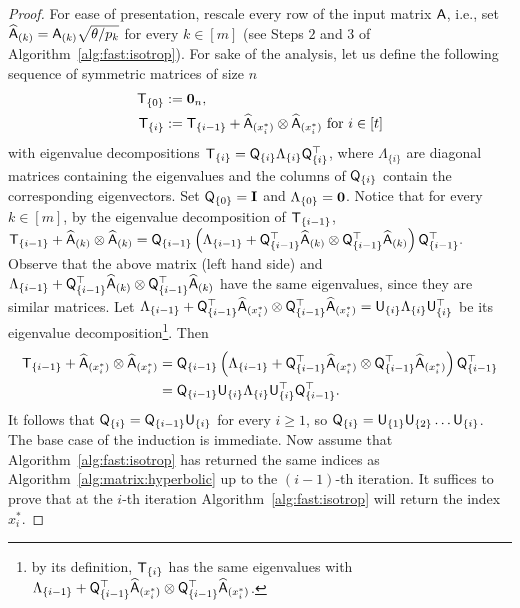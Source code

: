 \begin{proof}
%
For ease of presentation, rescale every row of the input matrix ${\mathsf{A} }$, i.e., set $ \widehat{{\mathsf{A} }}_{(k)} = {\mathsf{A} }_{(k)} \sqrt{ \theta / p_{k}}$ for every $k\in{[m]}$ (see Steps $2$ and $3$ of Algorithm~\ref{alg:fast:isotrop}). For sake of the analysis, let us define the following sequence of symmetric matrices of size $n$
\begin{align*}
{\ensuremath{\mathsf{T} }}_{\{0\}} &:= \mathbf{0}_n,\\
{\mathsf{T} }_{\{i\}} &:=  {\mathsf{T} }_{\{i - 1\}} + \widehat{{\mathsf{A} }}_{(x_i^*)} \otimes \widehat{{\mathsf{A} }}_{(x_i^*)}  \text{ for } i\in{[t]}
\end{align*}
with eigenvalue decompositions ${\mathsf{T} }_{\{i\}} = {\mathsf{Q} }_{\{i\}} \Lambda_{\{i\}} {\mathsf{Q} }^\top_{\{i\}} $, where $\Lambda_{\{i\}}$ are diagonal matrices containing the eigenvalues and the columns of ${\mathsf{Q} }_{\{i\}}$ contain the corresponding eigenvectors. Set ${\mathsf{Q} }_{\{0\}}=\mathbf{I}$ and $\Lambda_{\{0\}}=\mathbf{0}$.
Notice that for every $k\in{[m]}$, by the eigenvalue decomposition of ${\mathsf{T} }_{\{ i - 1\}}$, ${\mathsf{T} }_{\{ i - 1\}} +  \widehat{{\mathsf{A} }}_{(k)}\otimes \widehat{{\mathsf{A} }}_{(k)} = {\mathsf{Q} }_{\{i-1\}}\left(\Lambda_{\{i-1\}} + {\mathsf{Q} }_{\{i-1\}}^\top \widehat{{\mathsf{A} }}_{(k)} \otimes {\ensuremath{\mathsf{Q} }}_{\{i-1\}}^\top \widehat{{\mathsf{A} }}_{(k)}\right) {\mathsf{Q} }_{\{i - 1\}}^\top.$ Observe that the above matrix (left hand side) and $\Lambda_{\{i-1\}} + {\mathsf{Q} }_{\{i-1\}}^\top \widehat{{\mathsf{A} }}_{(k)} \otimes {\ensuremath{\mathsf{Q} }}_{\{i-1\}}^\top \widehat{{\mathsf{A} }}_{(k)}$ have the same eigenvalues, since they are similar matrices. Let $\Lambda_{\{i-1\}} + {\mathsf{Q} }_{\{i-1\}}^\top \widehat{{\mathsf{A} }}_{(x_i^*)} \otimes {\ensuremath{\mathsf{Q} }}_{\{i-1\}}^\top \widehat{{\mathsf{A} }}_{(x_i^*)}  = {\mathsf{U} }_{\{i\}} \Lambda_{\{i\}} {\mathsf{U} }_{\{i\}}^\top$ be its eigenvalue decomposition\footnote{by its definition, ${\mathsf{T} }_{\{i\}}$ has the same eigenvalues with $\Lambda_{\{i-1\}} + {\mathsf{Q} }_{\{i-1\}}^\top \widehat{{\mathsf{A} }}_{(x_i^*)} \otimes {\ensuremath{\mathsf{Q} }}_{\{i-1\}}^\top \widehat{{\mathsf{A} }}_{(x_i^*)}$.}. Then
\begin{align*}
{\ensuremath{\mathsf{T} }}_{\{i - 1\}} + \widehat{{\mathsf{A} }}_{(x_i^*)} \otimes \widehat{{\mathsf{A} }}_{(x_i^*)} &  =  {\mathsf{Q} }_{\{i-1\}}\left(\Lambda_{\{i-1\}} + {\mathsf{Q} }_{\{i-1\}}^\top \widehat{{\mathsf{A} }}_{(x_i^*)} \otimes {\ensuremath{\mathsf{Q} }}_{\{i-1\}}^\top \widehat{{\mathsf{A} }}_{(x_i^*)}\right) {\mathsf{Q} }_{\{i - 1\}}^\top\\
																				&  =  {\mathsf{Q} }_{\{i-1\}}{\mathsf{U} }_{\{i\}} \Lambda_{\{i\}} {\mathsf{U} }_{\{i\}}^\top  {\ensuremath{\mathsf{Q} }}_{\{i - 1\}}^\top.
\end{align*}
It follows that ${\mathsf{Q} }_{\{i\}} = {\mathsf{Q} }_{\{i-1\}} {\mathsf{U} }_{\{i\}}$ for every $i\geq 1$, so ${\mathsf{Q} }_{\{i\}} = {\mathsf{U} }_{\{1\}} {\mathsf{U} }_{\{2\}} \dots  {\ensuremath{\mathsf{U} }}_{\{i\}}$. The base case of the induction is immediate. Now assume that Algorithm~\ref{alg:fast:isotrop} has returned the same indices as Algorithm~\ref{alg:matrix:hyperbolic} up to the $(i-1)$-th iteration. It suffices to prove that at the $i$-th iteration Algorithm~\ref{alg:fast:isotrop} will return the index $x_i^*$.
%


\end{proof}
